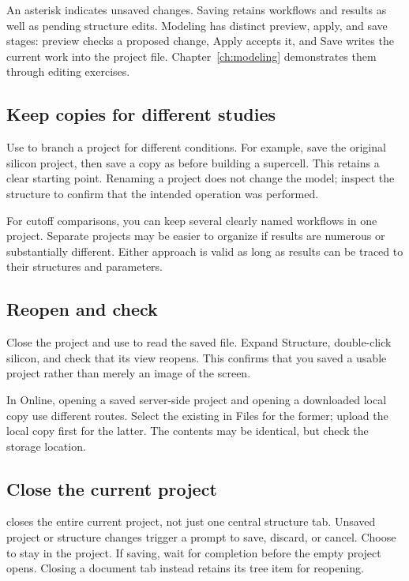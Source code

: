 An asterisk indicates unsaved changes. Saving retains workflows and results as well as pending structure edits. Modeling has distinct preview, apply, and save stages: preview checks a proposed change, Apply accepts it, and Save writes the current work into the project file. Chapter~\ref{ch:modeling} demonstrates them through editing exercises.

\subsection{Keep copies for different studies}
Use  to branch a project for different conditions. For example, save the original silicon project, then save a copy as  before building a supercell. This retains a clear starting point. Renaming a project does not change the model; inspect the structure to confirm that the intended operation was performed.

For cutoff comparisons, you can keep several clearly named workflows in one project. Separate projects may be easier to organize if results are numerous or substantially different. Either approach is valid as long as results can be traced to their structures and parameters.

\subsection{Reopen and check}
Close the project and use  to read the saved  file. Expand Structure, double-click silicon, and check that its view reopens. This confirms that you saved a usable project rather than merely an image of the screen.

In Online, opening a saved server-side project and opening a downloaded local copy use different routes. Select the existing  in Files for the former; upload the local copy first for the latter. The contents may be identical, but check the storage location.

\subsection{Close the current project}

 closes the entire current project, not just one central structure tab. Unsaved project or structure changes trigger a prompt to save, discard, or cancel. Choose  to stay in the project. If saving, wait for completion before the empty project opens. Closing a document tab instead retains its tree item for reopening.

